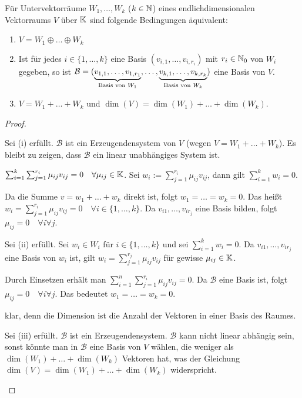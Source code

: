\begin{thm}
	Für Untervektorräume $ W_1, \ldots, W_k $ ($ k \in \mathbb N $) eines endlichdimensionalen Vektorraums $ V $ über $ \mathbb K $ sind folgende Bedingungen äquivalent:
	\begin{enumerate}
		\item $ V = W_1 \oplus \ldots \oplus W_k $
		\item Ist für jedes $ i \in \{ 1, \ldots, k \} $ eine Basis $ (v_{i,1}, \ldots, v_{i,r_i}) $ mit $ r_i \in \mathbb N_0 $ von $ W_i $ gegeben, so ist $ \mathcal{B} = (\underbrace{v_{1,1}, \ldots, v_{1,r_1}}_{\text{Basis von $ W_1 $}}, \ldots, \underbrace{v_{k,1}, \ldots, v_{k,r_k}}_{\text{Basis von $ W_k $}}) $ eine Basis von $ V $.
		\item $ V = W_1 + \ldots + W_k $ und $ \dim(V) = \dim(W_1) + \ldots + \dim(W_k) $.
	\end{enumerate}
\end{thm}
\begin{proof} 
\begin{description}[font=\normalfont]
	\item[(i)$ \Rightarrow $(ii):]
	Sei (i) erfüllt. $ \mathcal{B} $ ist ein Erzeugendensystem von $ V $ (wegen $ V = W_1 + \ldots + W_k $). Es bleibt zu zeigen, dass $ \mathcal{B} $ ein linear unabhängiges System ist.
	
	
	$ \sum_{i=1}^{k} \sum_{j=1}^{r_i} \mu_{ij} v_{ij} = 0 \quad \forall \mu_{ij} \in \mathbb K $. Sei $ w_i := \sum_{j=1}^{r_i}  \mu_{ij} v_{ij} $, dann gilt $ \sum_{i=1}^{k} w_i = 0 $.
	
	Da die Summe $ v = w_1 + \ldots + w_k $ direkt ist, folgt $ w_1 = \ldots = w_k = 0 $. Das heißt $ w_i = \sum_{j=1}^{r_i} \mu_{ij} v_{ij} = 0 \quad \forall i \in \{1, \ldots, k \} $. Da $ v_{i1}, \ldots, v_{ir_j} $ eine Basis bilden, folgt $ \mu_{ij} = 0 \quad \forall i \forall j $.
	
	\item[(ii)$ \Rightarrow $(i):]
	Sei (ii) erfüllt.
	Sei $ w_i \in W_i $ für $ i \in \{1,\ldots,k\} $ und sei $ \sum_{i = 1}^{k} w_i = 0 $. Da $ v_{i1}, \ldots, v_{ir_j} $ eine Basis von $ w_i $ ist, gilt $ w_i = \sum_{j = 1}^{r_j} \mu_{ij} v_{ij} $ für gewisse $ \mu_{ij} \in \mathbb K $.
	
	Durch Einsetzen erhält man $ \sum_{i = 1}^{n} \sum_{j = 1}^{r_i} \mu_{ij} v_{ij} = 0  $. Da $ \mathcal{B} $ eine Basis ist, folgt $ \mu_{ij} = 0 \quad \forall i \forall j $. Das bedeutet $ w_1 = \ldots = w_k = 0 $.
	
	\item[(ii)$ \Rightarrow $(iii):]
	klar, denn die Dimension ist die Anzahl der Vektoren in einer Basis des Raumes.
	
	\item[(iii)$ \Rightarrow $(ii):]
	Sei (iii) erfüllt.
	$ \mathcal{B} $ ist ein Erzeugendensystem. $ \mathcal{B} $ kann nicht linear abhängig sein, sonst könnte man in $ \mathcal{B} $ eine Basis von $ V $ wählen, die weniger als $ \dim(W_1) + \ldots + \dim(W_k) $ Vektoren hat, was der Gleichung $ \dim(V) = \dim(W_1) + \ldots + \dim(W_k) $ widerspricht. \qedhere
\end{description}
\end{proof}

